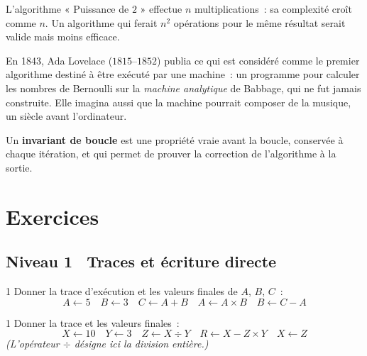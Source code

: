 \begin{remarque}
L'algorithme « Puissance de $2$ » effectue $n$ multiplications~: sa complexité
croît comme $n$. Un algorithme qui ferait $n^2$ opérations pour le même résultat
serait valide mais moins efficace.
\end{remarque}

\begin{anecdote}
En 1843, Ada Lovelace ($1815$--$1852$) publia ce qui est consid\'er\'e
comme le premier algorithme destin\'e \`a \^etre ex\'ecut\'e par une machine~:
un programme pour calculer les nombres de Bernoulli sur la
\emph{machine analytique} de Babbage, qui ne fut jamais construite.
Elle imagina aussi que la machine pourrait composer de la musique,
un si\`ecle avant l'ordinateur.
\end{anecdote}

\begin{defn}
Un \textbf{invariant de boucle} est une propri\'et\'e vraie avant
la boucle, conserv\'ee \`a chaque it\'eration, et qui permet de
prouver la correction de l'algorithme \`a la sortie.
\end{defn}



\section{Exercices}

\subsection*{\quad Niveau 1 \textemdash\ Traces et \'ecriture directe}

\begin{exo}{1}
Donner la trace d'ex\'ecution et les valeurs finales de $A$, $B$, $C$~:
\[
A \leftarrow 5 \quad B \leftarrow 3 \quad C \leftarrow A + B \quad
A \leftarrow A \times B \quad B \leftarrow C - A
\]
\end{exo}

\begin{exo}{1}
Donner la trace et les valeurs finales~:
\[
X \leftarrow 10 \quad Y \leftarrow 3 \quad
Z \leftarrow X \div Y \quad R \leftarrow X - Z \times Y \quad
X \leftarrow Z
\]
\emph{(L'op\'erateur $\div$ d\'esigne ici la division enti\`ere.)}
\end{exo}

